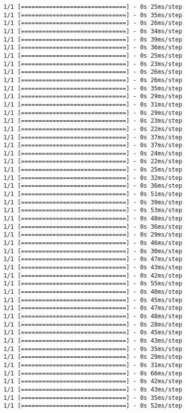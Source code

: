 \documentclass[11pt]{article}
\begin{document}
\begin{Verbatim}[commandchars=\\\{\}]
1/1 [==============================] - 0s 25ms/step
1/1 [==============================] - 0s 35ms/step
1/1 [==============================] - 0s 26ms/step
1/1 [==============================] - 0s 34ms/step
1/1 [==============================] - 0s 39ms/step
1/1 [==============================] - 0s 36ms/step
1/1 [==============================] - 0s 25ms/step
1/1 [==============================] - 0s 23ms/step
1/1 [==============================] - 0s 26ms/step
1/1 [==============================] - 0s 26ms/step
1/1 [==============================] - 0s 35ms/step
1/1 [==============================] - 0s 29ms/step
1/1 [==============================] - 0s 31ms/step
1/1 [==============================] - 0s 29ms/step
1/1 [==============================] - 0s 23ms/step
1/1 [==============================] - 0s 22ms/step
1/1 [==============================] - 0s 37ms/step
1/1 [==============================] - 0s 37ms/step
1/1 [==============================] - 0s 24ms/step
1/1 [==============================] - 0s 22ms/step
1/1 [==============================] - 0s 25ms/step
1/1 [==============================] - 0s 32ms/step
1/1 [==============================] - 0s 36ms/step
1/1 [==============================] - 0s 51ms/step
1/1 [==============================] - 0s 39ms/step
1/1 [==============================] - 0s 53ms/step
1/1 [==============================] - 0s 48ms/step
1/1 [==============================] - 0s 36ms/step
1/1 [==============================] - 0s 29ms/step
1/1 [==============================] - 0s 46ms/step
1/1 [==============================] - 0s 30ms/step
1/1 [==============================] - 0s 47ms/step
1/1 [==============================] - 0s 43ms/step
1/1 [==============================] - 0s 42ms/step
1/1 [==============================] - 0s 55ms/step
1/1 [==============================] - 0s 40ms/step
1/1 [==============================] - 0s 45ms/step
1/1 [==============================] - 0s 47ms/step
1/1 [==============================] - 0s 48ms/step
1/1 [==============================] - 0s 28ms/step
1/1 [==============================] - 0s 45ms/step
1/1 [==============================] - 0s 43ms/step
1/1 [==============================] - 0s 35ms/step
1/1 [==============================] - 0s 29ms/step
1/1 [==============================] - 0s 31ms/step
1/1 [==============================] - 0s 66ms/step
1/1 [==============================] - 0s 42ms/step
1/1 [==============================] - 0s 43ms/step
1/1 [==============================] - 0s 35ms/step
1/1 [==============================] - 0s 52ms/step

\end{Verbatim}
\end{document}
